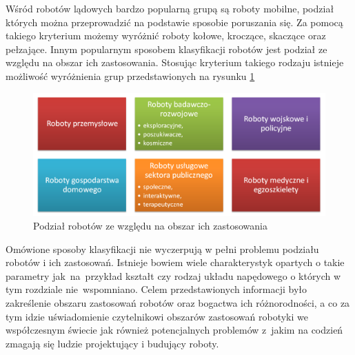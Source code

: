 Wśród robotów lądowych bardzo popularną grupą są roboty mobilne, podział których
można przeprowadzić na podstawie sposobie poruszania się. Za pomocą takiego
kryterium możemy wyróżnić roboty kołowe, kroczące, skaczące oraz pełzające.
Innym popularnym sposobem klasyfikacji robotów jest podział ze względu na 
obszar ich zastosowania. Stosując kryterium takiego rodzaju istnieje możliwość
wyróżnienia grup przedstawionych na rysunku \ref{fig:RobotsDiv}
\begin{figure}[hb]
 \centering
 \includegraphics[width=\textwidth]{../images/ch01/robot_types.png}
 \caption{Podział robotów ze względu na obszar ich zastosowania}
 \label{fig:RobotsDiv}
\end{figure}

Omówione sposoby klasyfikacji nie wyczerpują w pełni problemu podziału
robotów i ich zastosowań. Istnieje bowiem wiele charakterystyk opartych o takie
parametry jak~na~przykład kształt czy rodzaj układu napędowego o których w tym
rozdziale nie~wspomniano. Celem przedstawionych informacji było zakreślenie
obszaru zastosowań robotów oraz bogactwa ich różnorodności, a co za tym idzie
uświadomienie czytelnikowi obszarów zastosowań robotyki we współczesnym świecie
jak również potencjalnych problemów z~jakim na codzień zmagają się ludzie
projektujący i budujący roboty.